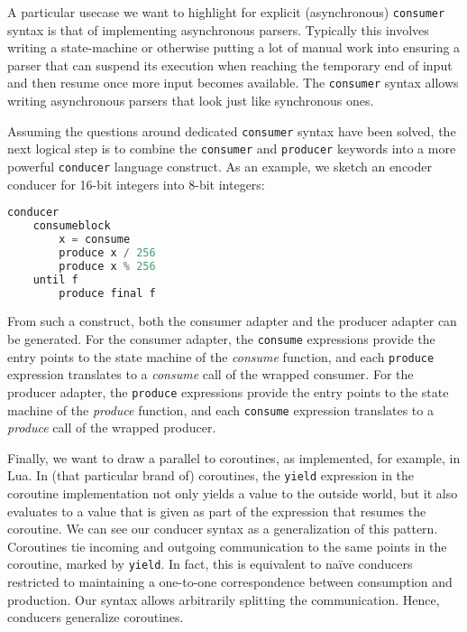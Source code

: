 \documentclass[sigplan,screen,10pt,anonymous,review]{acmart}
\begin{document}
A particular usecase we want to highlight for explicit (asynchronous) \texttt{consumer} syntax is that of implementing asynchronous parsers. Typically this involves writing a state-machine or otherwise putting a lot of manual work into ensuring a parser that can suspend its execution when reaching the temporary end of input and then resume once more input becomes available. The \texttt{consumer} syntax allows writing asynchronous parsers that look just like synchronous ones.

Assuming the questions around dedicated \texttt{consumer} syntax have been solved, the next logical step is to combine the \texttt{consumer} and \texttt{producer} keywords into a more powerful \texttt{conducer} language construct. As an example, we sketch an encoder conducer for 16-bit integers into 8-bit integers:

\begin{lstlisting}[language=Python]
conducer
    consumeblock
        x = consume
        produce x / 256
        produce x % 256
    until f
        produce final f
\end{lstlisting}

From such a construct, both the consumer adapter and the producer adapter can be generated. For the consumer adapter, the \texttt{consume} expressions provide the entry points to the state machine of the \textit{consume} function, and each \texttt{produce} expression translates to a \textit{consume} call of the wrapped consumer. For the producer adapter, the \texttt{produce} expressions provide the entry points to the state machine of the \textit{produce} function, and each \texttt{consume} expression translates to a \textit{produce} call of the wrapped producer.


Finally, we want to draw a parallel to coroutines\cite{moura2009revisiting}, as implemented, for example, in Lua\cite{ierusalimschy2006programming}. In (that particular brand of) coroutines, the \texttt{yield} expression in the coroutine implementation not only yields a value to the outside world, but it also evaluates to a value that is given as part of the expression that resumes the coroutine. We can see our conducer syntax as a generalization of this pattern. Coroutines tie incoming and outgoing communication to the same points in the coroutine, marked by \texttt{yield}. In fact, this is equivalent to naïve conducers restricted to maintaining a one-to-one correspondence between consumption and production. Our syntax allows arbitrarily splitting the communication. Hence, conducers generalize coroutines.
\end{document}
